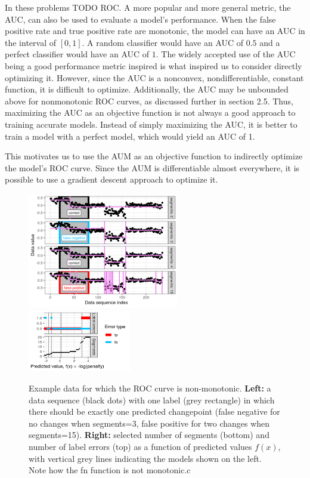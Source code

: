 \documentclass{article}
\begin{document}
In these problems TODO ROC.
A more popular and more general metric, the AUC, can also be used to evaluate a model's performance. When the false positive rate and true positive rate are monotonic, the model can have an AUC in the interval of $[0, 1]$. 
A random classifier would have an AUC of $0.5$ and a perfect classifier would have an AUC of $1$. 
The widely accepted use of the AUC being a good performance metric inspired is what inspired us to consider directly optimizing it. 
However, since the AUC is a nonconvex, nondifferentiable, constant function, it is difficult to optimize.
Additionally, the AUC may be unbounded above for nonmonotonic ROC curves, as discussed further in section 2.5.
Thus, maximizing the AUC as an objective function is not always a good approach to training accurate models. 
Instead of simply maximizing the AUC, it is better to train a model with a perfect model, which would yield an AUC of 1.

This motivates us to use the AUM as an objective function to indirectly optimize the model's ROC curve. Since the AUM is differentiable almost everywhere, it is possible to use a gradient descent approach to optimize it.


\begin{figure}[ht]
\vskip 0.2in
\begin{center}
\includegraphics[width=0.59\textwidth]{figure-fn-not-monotonic.png}
\includegraphics[width=0.4\textwidth]{figure-fn-not-monotonic-error.png}
\vskip -0.5cm
\caption{Example data for which the ROC curve is non-monotonic. 
\textbf{Left:} a data sequence (black dots) with one label (grey rectangle) in which there should be exactly one predicted changepoint (false negative for no changes when segments=3, false positive for two changes when segments=15).  
\textbf{Right:} selected number of segments (bottom) and number of label errors (top) as a function of predicted values $f(x)$, with vertical grey lines indicating the models shown on the left. Note how the fn function is not monotonic.c
}
\label{fig:fn-not-monotonic}
\end{center}
\vskip -0.2in
\end{figure}
\end{document}
